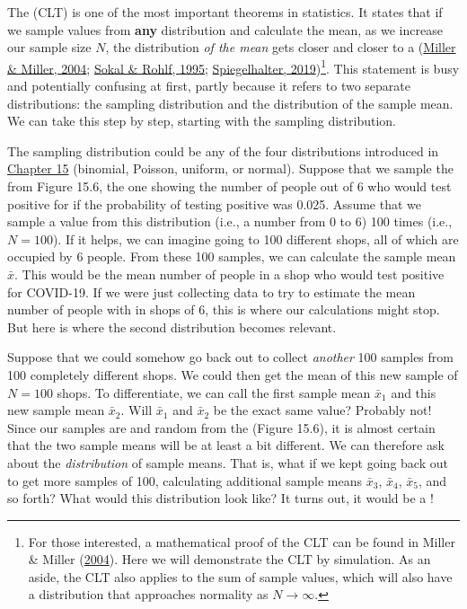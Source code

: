 \documentclass[
  openany]{krantz}
\begin{document}
The  (CLT) is one of the most important theorems in statistics.
It states that if we sample values from \textbf{any} distribution and calculate the mean, as we increase our sample size \(N\), the distribution \emph{of the mean} gets closer and closer to a  (\protect\hyperlink{ref-Miller2004}{Miller \& Miller, 2004}; \protect\hyperlink{ref-Sokal1995}{Sokal \& Rohlf, 1995}; \protect\hyperlink{ref-Spiegelhalter2019}{Spiegelhalter, 2019})\({ }\)\footnote{For those interested, a mathematical proof of the CLT can be found in Miller \& Miller (\protect\hyperlink{ref-Miller2004}{2004}). Here we will demonstrate the CLT by simulation. As an aside, the CLT also applies to the sum of sample values, which will also have a distribution that approaches normality as \(N \to \infty\).}.
This statement is busy and potentially confusing at first, partly because it refers to two separate distributions: the sampling distribution and the distribution of the sample mean.
We can take this step by step, starting with the sampling distribution.

The sampling distribution could be any of the four distributions introduced in \protect\hyperlink{Chapter_15}{Chapter 15} (binomial, Poisson, uniform, or normal).
Suppose that we sample the  from Figure 15.6, the one showing the number of people out of 6 who would test positive for  if the probability of testing positive was 0.025.
Assume that we sample a value from this distribution (i.e., a number from 0 to 6) 100 times (i.e., \(N = 100\)).
If it helps, we can imagine going to 100 different shops, all of which are occupied by 6 people.
From these 100 samples, we can calculate the sample mean \(\bar{x}\).
This would be the mean number of people in a shop who would test positive for COVID-19.
If we were just collecting data to try to estimate the mean number of people with  in shops of 6, this is where our calculations might stop.
But here is where the second distribution becomes relevant.

\newpage

Suppose that we could somehow go back out to collect \emph{another} 100 samples from 100 completely different shops.
We could then get the mean of this new sample of \(N = 100\) shops.
To differentiate, we can call the first sample mean \(\bar{x}_{1}\) and this new sample mean \(\bar{x}_{2}\).
Will \(\bar{x}_{1}\) and \(\bar{x}_{2}\) be the exact same value?
Probably not!
Since our samples are  and random from the  (Figure 15.6), it is almost certain that the two sample means will be at least a bit different.
We can therefore ask about the \emph{distribution} of sample means.
That is, what if we kept going back out to get more samples of 100, calculating additional sample means \(\bar{x}_{3}\), \(\bar{x}_{4}\), \(\bar{x}_{5}\), and so forth?
What would this distribution look like?
It turns out, it would be a !
\end{document}
